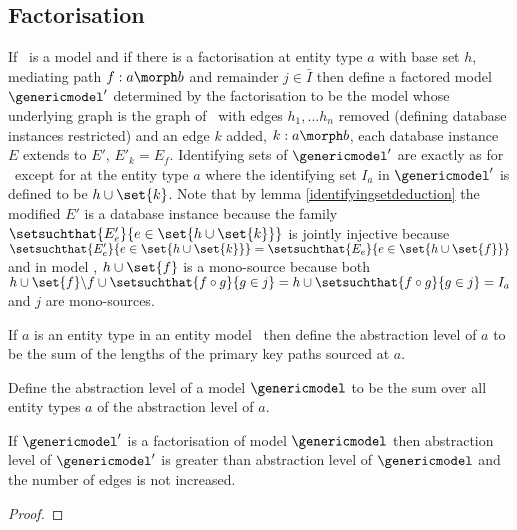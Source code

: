 \subsection{Factorisation}
\begin{definition}
If \genericmodel\ is a model and if there is a factorisation at entity type $a$ with
base set $h$, mediating path $f: a \morph b$ and remainder $j \in \bar{I}$ then define
a factored model $\genericmodel'$ determined by the factorisation to be the model
whose underlying graph is the graph of \genericmodel\ with edges $h_1,...h_n$ removed 
(defining database instances restricted) and
an edge $k$ added, $k:a \morph b$, each database instance $E$ extends to $E'$, $E'_k = E_f$.
Identifying sets of $\genericmodel'$ are exactly as for \genericmodel\ except for at the entity
type $a$ where the identifying set $I_a$ in $\genericmodel'$ is defined to be $h \cup \set{k}$.
Note that by lemma \ref{identifyingsetdeduction} the modified $E'$ is a database instance because
the family 
$\setsuchthat{E'_e}{e \in \set{h \cup \set{k}}}$ is jointly injective because 
$\setsuchthat{E'_e}{e \in \set{h \cup \set{k}}} =\setsuchthat{E_e}{e \in \set{h \cup \set{f}}}$
and in model \genericmodel, $h \cup \set{f}$ is a mono-source because both
$h \cup \set{f} \backslash f \cup \setsuchthat{f \circ g}{g \in j}
=h  \cup \setsuchthat{f \circ g}{g \in j}=I_a$ and $j$ are  mono-sources.


\end{definition}

\begin{definition}
If $a$ is an entity type in an entity model \genericmodel\ then define the abstraction
level of $a$ to be the sum of the lengths of the primary key paths sourced at $a$.
\end{definition}


\begin{definition}
Define  the abstraction level of a model $\genericmodel$ to be
the sum over all entity types $a$ of the abstraction level of $a$.
\end{definition}

\begin{lemma}
If $\genericmodel'$ is a factorisation of model $\genericmodel$ then abstraction level 
of $\genericmodel'$ is greater than abstraction level of $\genericmodel$ and the number of edges
is not increased. 
\end{lemma}
\begin{proof}
\end{proof}

